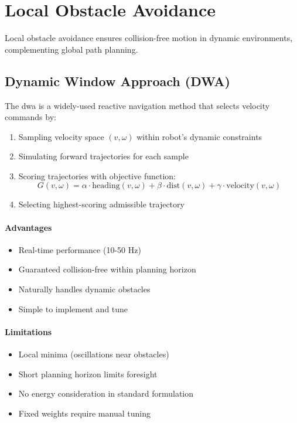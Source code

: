 \section{Local Obstacle Avoidance}
\label{sec:lit_obstacle}

Local obstacle avoidance ensures collision-free motion in dynamic environments, complementing global path planning.

\subsection{Dynamic Window Approach (DWA)}

The \acrshort{dwa} \cite{Fox1997} is a widely-used reactive navigation method that selects velocity commands by:
\begin{enumerate}
    \item Sampling velocity space $(v, \omega)$ within robot's dynamic constraints
    \item Simulating forward trajectories for each sample
    \item Scoring trajectories with objective function:
    \begin{equation}
    G(v, \omega) = \alpha \cdot \text{heading}(v,\omega) + \beta \cdot \text{dist}(v,\omega) + \gamma \cdot \text{velocity}(v,\omega)
    \end{equation}
    \item Selecting highest-scoring admissible trajectory
\end{enumerate}

\paragraph{Advantages}
\begin{itemize}
    \item Real-time performance (10-50 Hz)
    \item Guaranteed collision-free within planning horizon
    \item Naturally handles dynamic obstacles
    \item Simple to implement and tune
\end{itemize}

\paragraph{Limitations}
\begin{itemize}
    \item Local minima (oscillations near obstacles)
    \item Short planning horizon limits foresight
    \item No energy consideration in standard formulation
    \item Fixed weights require manual tuning
\end{itemize}

